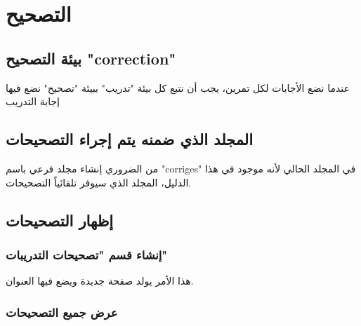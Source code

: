 \documentclass[12pt,a4paper]{mathbook_arabic}
\newcommand\ee{\textenglish}
\begin{document}
 \newpage
\pagecolor{white}
 
 \section{التصحيح}
 
 \subsection{بيئة التصحيح \ee{"correction"} }
 
 عندما نضع الأجابات لكل تمرين، يجب أن نتبع كل بيئة "تدريب" ببيئة "تصحيح" نضع فيها إجابة التدريب
 
 
 
 
 
 \subsection{المجلد الذي ضمنه يتم إجراء التصحيحات}
 من الضروري إنشاء مجلد فرعي باسم 
 \ee{"corriges"}
 في المجلد الحالي لأنه موجود في هذا الدليل، المجلد الذي سيوفر تلقائياً التصحيحات.
 
 \subsection{إظهار التصحيحات }
 \subsubsection{إنشاء قسم "تصحيحات التدريبات"}
 
\LR{\begin{lstlisting}
 \corrstart
\end{lstlisting}}
 
 هذا الأمر يولد صفحة جديدة ويضع فيها العنوان.
 
 
 \subsubsection{عرض جميع التصحيحات}
  
 
\end{document}
